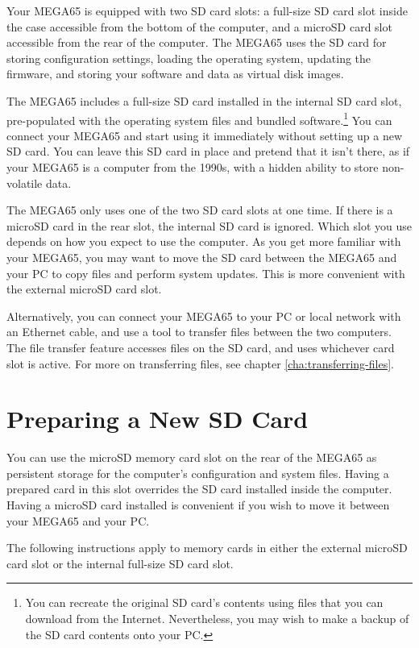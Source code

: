 Your MEGA65 is equipped with two SD card slots: a full-size SD card slot inside the case accessible from the bottom of the computer, and a microSD card slot accessible from the rear of the computer. The MEGA65 uses the SD card for storing configuration settings, loading the operating system, updating the firmware, and storing your software and data as virtual disk images.

The MEGA65 includes a full-size SD card installed in the internal SD card slot, pre-populated with the operating system files and bundled software.\footnote{You can recreate the original SD card's contents using files that you can download from the Internet. Nevertheless, you may wish to make a backup of the SD card contents onto your PC.} You can connect your MEGA65 and start using it immediately without setting up a new SD card. You can leave this SD card in place and pretend that it isn't there, as if your MEGA65 is a computer from the 1990s, with a hidden ability to store non-volatile data.

The MEGA65 only uses one of the two SD card slots at one time. If there is a microSD card in the rear slot, the internal SD card is ignored. Which slot you use depends on how you expect to use the computer. As you get more familiar with your MEGA65, you may want to move the SD card between the MEGA65 and your PC to copy files and perform system updates. This is more convenient with the external microSD card slot.

Alternatively, you can connect your MEGA65 to your PC or local network with an Ethernet cable, and use a tool to transfer files between the two computers. The file transfer feature accesses files on the SD card, and uses whichever card slot is active. For more on transferring files, see chapter \vref{cha:transferring-files}.

\section{Preparing a New SD Card}

You can use the microSD memory card slot on the rear of the MEGA65 as persistent storage for the computer's configuration and system files. Having a prepared card in this slot overrides the SD card installed inside the computer. Having a microSD card installed is convenient if you wish to move it between your MEGA65 and your PC.

The following instructions apply to memory cards in either the external microSD card slot or the internal full-size SD card slot.

